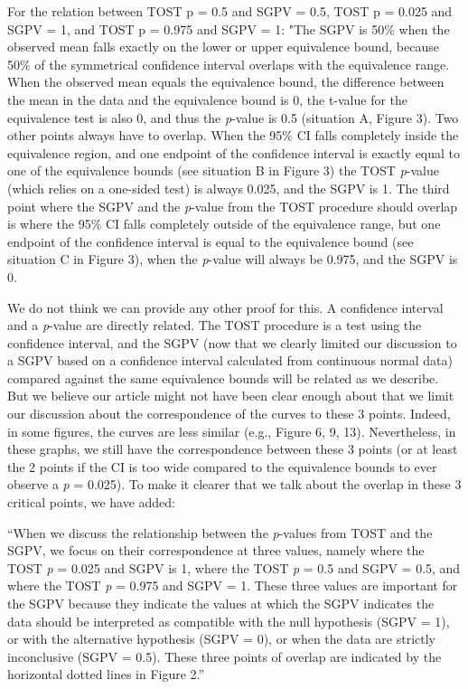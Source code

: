 \documentclass[man]{apa6}
\begin{document}
For the relation between TOST p = 0.5 and SGPV = 0.5, TOST p = 0.025 and SGPV = 1, and TOST p = 0.975 and SGPV = 1: "The SGPV is 50\% when the observed mean falls exactly on the lower or upper equivalence bound, because 50\% of the symmetrical confidence interval overlaps with the equivalence range. When the observed mean equals the equivalence bound, the difference between the mean in the data and the equivalence bound is 0, the t-value for the equivalence test is also 0, and thus the \emph{p}-value is 0.5 (situation A, Figure 3). Two other points always have to overlap. When the 95\% CI falls completely inside the equivalence region, and one endpoint of the confidence interval is exactly equal to one of the equivalence bounds (see situation B in Figure 3) the TOST \emph{p}-value (which relies on a one-sided test) is always 0.025, and the SGPV is 1. The third point where the SGPV and the \emph{p}-value from the TOST procedure should overlap is where the 95\% CI falls completely outside of the equivalence range, but one endpoint of the confidence interval is equal to the equivalence bound (see situation C in Figure 3), when the \emph{p}-value will always be 0.975, and the SGPV is 0.

We do not think we can provide any other proof for this. A confidence interval and a \emph{p}-value are directly related. The TOST procedure is a test using the confidence interval, and the SGPV (now that we clearly limited our discussion to a SGPV based on a confidence interval calculated from continuous normal data) compared against the same equivalence bounds will be related as we describe. But we believe our article might not have been clear enough about that we limit our discussion about the correspondence of the curves to these 3 points. Indeed, in some figures, the curves are less similar (e.g., Figure 6, 9, 13). Nevertheless, in these graphs, we still have the correspondence between these 3 points (or at least the 2 points if the CI is too wide compared to the equivalence bounds to ever observe a \emph{p} = 0.025). To make it clearer that we talk about the overlap in these 3 critical points, we have added:

\enquote{When we discuss the relationship between the \emph{p}-values from TOST and the SGPV, we focus on their correspondence at three values, namely where the TOST \emph{p} = 0.025 and SGPV is 1, where the TOST \emph{p} = 0.5 and SGPV = 0.5, and where the TOST \emph{p} = 0.975 and SGPV = 1. These three values are important for the SGPV because they indicate the values at which the SGPV indicates the data should be interpreted as compatible with the null hypothesis (SGPV = 1), or with the alternative hypothesis (SGPV = 0), or when the data are strictly inconclusive (SGPV = 0.5). These three points of overlap are indicated by the horizontal dotted lines in Figure 2.}
\end{document}
